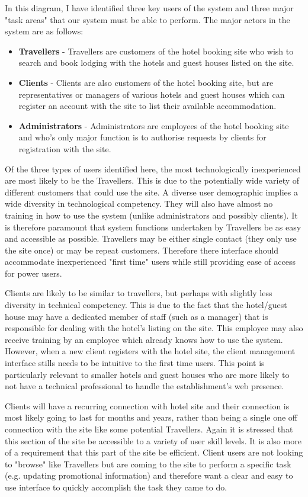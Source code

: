 \documentclass{article}
\begin{document}
In this diagram, I have identified three key users of the system and three major "task areas" that our system must be able to perform. The major actors in the system are as follows:
\begin{itemize}
	\item \textbf{Travellers} - Travellers are customers of the hotel booking site who wish to search and book lodging with the hotels and guest houses listed on the site.
	\item \textbf{Clients} - Clients are also customers of the hotel booking site, but are representatives or managers of various hotels and guest houses which can register an account with the site to list their available accommodation.
	\item \textbf{Administrators} - Administrators are employees of the hotel booking site and who's only major function is to authorise requests by clients for registration with the site.
\end{itemize}

Of the three types of users identified here, the most technologically inexperienced are most likely to be the Travellers. This is due to the potentially wide variety of different customers that could use the site. A diverse user demographic implies a wide diversity in technological competency. They  will also have almost no training in how to use the system (unlike administrators and possibly clients). It is therefore paramount that system functions undertaken by Travellers be as easy and accessible as possible. Travellers may be either single contact (they only use the site once) or may be repeat customers. Therefore there interface should accommodate inexperienced "first time" users while still providing ease of access for power users.

Clients are likely to be similar to travellers, but perhaps with slightly less diversity in technical competency. This is due to the fact that the hotel/guest house may have a dedicated member of staff (such as a manager) that is responsible for dealing with the hotel's listing on the site. This employee may also receive training by an employee which already knows how to use the system. However, when a new client registers with the hotel site, the client management interface stills needs to be intuitive to the first time users. This point is particularly relevant to smaller hotels and guest houses who are more likely to not have a technical professional to handle the establishment's web presence.

Clients will have a recurring connection with hotel site and their connection is most likely going to last for months and years, rather than being a single one off connection with the site like some potential Travellers. Again it is stressed that this section of the site be accessible to a variety of user skill levels. It is also more of a requirement that this part of the site be efficient. Client users are not looking to "browse" like Travellers but are coming to the site to perform a specific task (e.g. updating promotional information) and therefore want a clear and easy to use interface to quickly accomplish the task they came to do.
\end{document}

